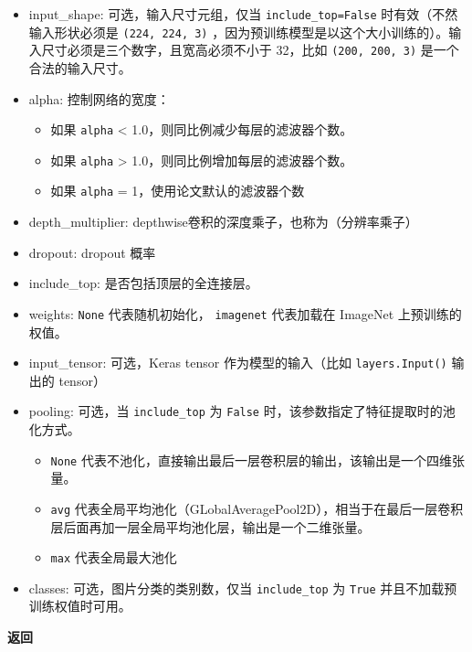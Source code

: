 \begin{itemize}
\tightlist
\item
  input\_shape: 可选，输入尺寸元组，仅当 \texttt{include\_top=False}
  时有效（不然输入形状必须是 \texttt{(224,\ 224,\ 3)}
  ，因为预训练模型是以这个大小训练的）。输入尺寸必须是三个数字，且宽高必须不小于
  32，比如 \texttt{(200,\ 200,\ 3)} 是一个合法的输入尺寸。
\item
  alpha: 控制网络的宽度：

  \begin{itemize}
  \tightlist
  \item
    如果 \texttt{alpha} \textless{} 1.0，则同比例减少每层的滤波器个数。
  \item
    如果 \texttt{alpha} \textgreater{}
    1.0，则同比例增加每层的滤波器个数。
  \item
    如果 \texttt{alpha} = 1，使用论文默认的滤波器个数
  \end{itemize}
\item
  depth\_multiplier: depthwise卷积的深度乘子，也称为（分辨率乘子）
\item
  dropout: dropout 概率
\item
  include\_top: 是否包括顶层的全连接层。
\item
  weights: \texttt{None} 代表随机初始化，
  \texttt{\textquotesingle{}imagenet\textquotesingle{}} 代表加载在
  ImageNet 上预训练的权值。
\item
  input\_tensor: 可选，Keras tensor 作为模型的输入（比如
  \texttt{layers.Input()} 输出的 tensor）
\item
  pooling: 可选，当 \texttt{include\_top} 为 \texttt{False}
  时，该参数指定了特征提取时的池化方式。

  \begin{itemize}
  \tightlist
  \item
    \texttt{None}
    代表不池化，直接输出最后一层卷积层的输出，该输出是一个四维张量。
  \item
    \texttt{\textquotesingle{}avg\textquotesingle{}}
    代表全局平均池化（GLobalAveragePool2D），相当于在最后一层卷积层后面再加一层全局平均池化层，输出是一个二维张量。
  \item
    \texttt{\textquotesingle{}max\textquotesingle{}} 代表全局最大池化
  \end{itemize}
\item
  classes: 可选，图片分类的类别数，仅当 \texttt{include\_top} 为
  \texttt{True} 并且不加载预训练权值时可用。
\end{itemize}

\textbf{返回}\label{ux8fd4ux56de}

